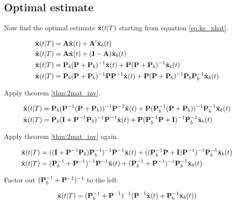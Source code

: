 \subsection{Optimal estimate}

Now find the optimal estimate $\hat{\mathbf{x}}(t|T)$ starting from equation
\eqref{eq:ks_xhat}.

\begin{align*}
  \hat{\mathbf{x}}(t|T) &= \mathbf{A}\hat{\mathbf{x}}(t) + \mathbf{A}'\hat{\mathbf{x}}_b(t) \\
  \hat{\mathbf{x}}(t|T) &= \mathbf{A}\hat{\mathbf{x}}(t) +
    (\mathbf{I} - \mathbf{A})\hat{\mathbf{x}}_b(t) \\
  \hat{\mathbf{x}}(t|T) &=
    \mathbf{P}_b(\mathbf{P} + \mathbf{P}_b)^{-1}\hat{\mathbf{x}}(t) +
    \mathbf{P}(\mathbf{P} + \mathbf{P}_b)^{-1}\hat{\mathbf{x}}_b(t) \\
  \hat{\mathbf{x}}(t|T) &=
    \mathbf{P}_b(\mathbf{P} + \mathbf{P}_b)^{-1}\mathbf{P}\mathbf{P}^{-1}\hat{\mathbf{x}}(t) +
    \mathbf{P}(\mathbf{P} + \mathbf{P}_b)^{-1}\mathbf{P}_b\mathbf{P}_b^{-1}\hat{\mathbf{x}}_b(t)
\end{align*}

Apply theorem \ref{thm:2mat_inv}.

\begin{align*}
  \hat{\mathbf{x}}(t|T) &=
    \mathbf{P}_b(\mathbf{P}^{-1}(\mathbf{P} + \mathbf{P}_b))^{-1}
      \mathbf{P}^{-1}\hat{\mathbf{x}}(t) +
    \mathbf{P}(\mathbf{P}_b^{-1}(\mathbf{P} + \mathbf{P}_b))^{-1}
      \mathbf{P}_b^{-1}\hat{\mathbf{x}}_b(t) \\
  \hat{\mathbf{x}}(t|T) &=
    \mathbf{P}_b(\mathbf{I} + \mathbf{P}^{-1}\mathbf{P}_b)^{-1}
      \mathbf{P}^{-1}\hat{\mathbf{x}}(t) +
    \mathbf{P}(\mathbf{P}_b^{-1}\mathbf{P} + \mathbf{I})^{-1}
      \mathbf{P}_b^{-1}\hat{\mathbf{x}}_b(t)
\end{align*}

Apply theorem \ref{thm:2mat_inv} again.

\begin{align*}
  \hat{\mathbf{x}}(t|T) &=
    ((\mathbf{I} + \mathbf{P}^{-1}\mathbf{P}_b)\mathbf{P}_b^{-1})^{-1}
      \mathbf{P}^{-1}\hat{\mathbf{x}}(t) +
    ((\mathbf{P}_b^{-1}\mathbf{P} + \mathbf{I})\mathbf{P}^{-1})^{-1}
      \mathbf{P}_b^{-1}\hat{\mathbf{x}}_b(t) \\
  \hat{\mathbf{x}}(t|T) &=
    (\mathbf{P}_b^{-1} + \mathbf{P}^{-1})^{-1}\mathbf{P}^{-1}\hat{\mathbf{x}}(t) +
    (\mathbf{P}_b^{-1} + \mathbf{P}^{-1})^{-1}\mathbf{P}_b^{-1}\hat{\mathbf{x}}_b(t)
\end{align*}

Factor out $(\mathbf{P}_b^{-1} + \mathbf{P}^{-1})^{-1}$ to the left.

\begin{equation*}
  \hat{\mathbf{x}}(t|T) =
    (\mathbf{P}_b^{-1} + \mathbf{P}^{-1})^{-1}
    (\mathbf{P}^{-1}\hat{\mathbf{x}}(t) + \mathbf{P}_b^{-1}\hat{\mathbf{x}}_b(t))
\end{equation*}

